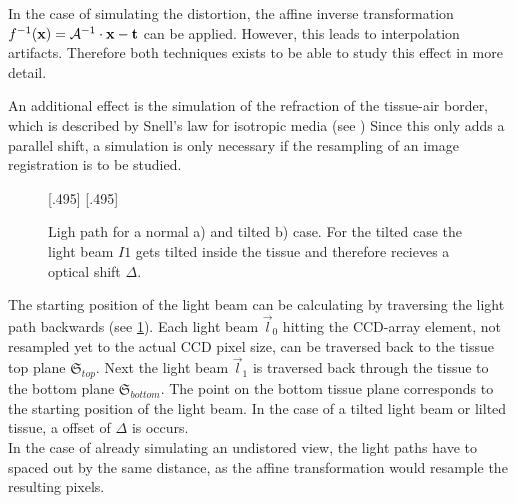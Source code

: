 In the case of simulating the distortion, the affine inverse transformation $f^{-1}(\mathbf{x}) = \mathcal{A}^{-1} \cdot \mathbf{x} - \mathbf{t}$ can be applied.
However, this leads to interpolation artifacts.
Therefore both techniques exists to be able to study this effect in more detail.
\par
%
An additional effect is the simulation of the refraction of the tissue-air border, which is described by Snell's law for isotropic media (see \dummy{})
Since this only adds a parallel shift, a simulation is only necessary if the resampling of an image registration is to be studied.
\par
%
\begin{figure}[!t]
\setlength{\tikzwidth}{0.42\textwidth}
[.495\textwidth]{
\def\tilt{0}
\def\nindex{2.25}
}\hfill
{}[.495\textwidth]{
}
\caption[Light path]{Ligh path for a normal a) and tilted b) case. For the tilted case the light beam $I1$  gets tilted inside the tissue and therefore recieves a optical shift $\Delta$.}
\label{fig:tilted_side_view}
\end{figure}
%
The starting position of the light beam can be calculating by traversing the light path backwards (see \cref{fig:tilted_side_view}).
Each light beam $\vec{l}_0$ hitting the \ac{CCD}-array element, not resampled yet to the actual \ac{CCD} pixel size, can be traversed back to the tissue top plane $\mathfrak{S}_{top}$.
Next the light beam $\vec{l}_1$ is traversed back through the tissue to the bottom plane $\mathfrak{S}_{bottom}$.
The point on the bottom tissue plane corresponds to the starting position of the light beam.
In the case of a tilted light beam or lilted tissue, a offset of $\Delta$ is occurs.
\\
%
In the case of already simulating an undistored view, the light paths have to spaced out by the same distance, as the affine transformation would resample the resulting pixels.
%
\begin{lstfloat}[!p]
	
	\caption{Pseudocode simulation }
	\label{alg:simulation}
\end{lstfloat}
%

